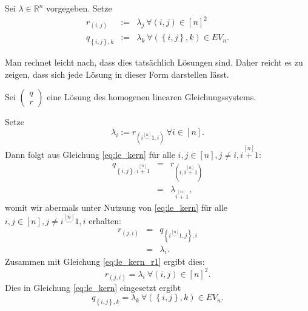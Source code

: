 \documentclass[10p,a4paper,BCOR = 12mm, DIV=15]{scrbook}
\begin{document}
{\begin{Le}
Sei $\lambda\in\mathbb{R}^n$ vorgegeben. Setze
\begin{eqnarray}
r_{\left(i, j\right)} & := & \lambda_j\ \forall \left(i, j\right)\in\left[n\right]^2  \label{eq:le_kern_r_final} \\
q_{\left\{i, j\right\},k} & := & \lambda_k\ \forall \left(\left\{i, j\right\}, k\right)\in EV_n. \label{eq:le_kern_q_final}
\end{eqnarray}
\end{Le}
\begin{bew}
Man rechnet leicht nach, dass dies tatsächlich Lösungen sind. Daher reicht es zu zeigen, dass sich jede Lösung in dieser Form darstellen lässt.

Sei $\left(\begin{array}{c}
q \\
r
\end{array}\right)$ eine Lösung des homogenen linearen Gleichungssystems.

Setze
\begin{equation}
\lambda_{i} := r_{\left(i \stackrel{[n]}{-} 1, i\right)} \ \forall i\in\left[n\right]. \label{eq:le_kern_r1}
\end{equation}
Dann folgt aus Gleichung \eqref{eq:le_kern} für alle $i, j\in\left[n\right], j\neq i, i \stackrel{[n]}{+} 1$:
\begin{eqnarray*}
q_{\left\{i, j\right\}, i \stackrel{[n]}{+} 1} & = & r_{\left(i, i \stackrel{[n]}{+} 1\right)} \\
& = & \lambda_{i \stackrel{[n]}{+} 1},
\end{eqnarray*}
womit wir abermals unter Nutzung von \eqref{eq:le_kern} für alle $i, j\in\left[n\right], j\neq i \stackrel{[n]}{-} 1, i$ erhalten:
\begin{eqnarray*}
r_{\left(j, i\right)} & = & q_{\left\{i \stackrel{[n]}{-} 1, j\right\}, i} \\
& = & \lambda_i.
\end{eqnarray*}
Zusammen mit Gleichung \eqref{eq:le_kern_r1} ergibt dies:
\begin{displaymath}
r_{\left(j, i\right)} = \lambda_i\ \forall \left(i, j\right)\in\left[n\right]^2.
\end{displaymath}
Dies in Gleichung \eqref{eq:le_kern} eingesetzt ergibt
\begin{displaymath}
q_{\left\{i, j\right\},k} = \lambda_k\ \forall \left(\left\{i, j\right\}, k\right)\in EV_n.
\end{displaymath}
\end{bew}

}
\end{document}

